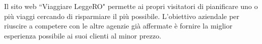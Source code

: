 \documentclass[main.tex]{subfiles}
\begin{document}
Il sito web ``Viaggiare LeggeRO" permette ai propri visitatori di pianificare uno o più viaggi cercando di risparmiare il più possibile.
L’obiettivo aziendale per riuscire a competere con le altre agenzie già affermate è fornire la miglior esperienza possibile ai suoi clienti al minor prezzo.
\end{document}
